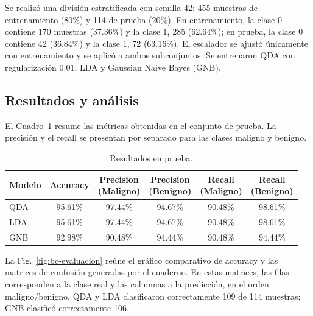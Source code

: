 \documentclass[conference]{IEEEtran}
\begin{document}
Se realizó una división estratificada con semilla 42: 455 muestras de entrenamiento (80\%) y 114 de prueba (20\%). En entrenamiento, la clase 0 contiene 170 muestras (37.36\%) y la clase 1, 285 (62.64\%); en prueba, la clase 0 contiene 42 (36.84\%) y la clase 1, 72 (63.16\%). El escalador se ajustó únicamente con entrenamiento y se aplicó a ambos subconjuntos. Se entrenaron QDA con regularización $0.01$, LDA y Gaussian Naive Bayes (GNB).

\subsection{Resultados y análisis}
El Cuadro~\ref{tab:metricas} resume las métricas obtenidas en el conjunto de prueba. La precisión y el recall se presentan por separado para las clases maligno y benigno.

\begin{table}[!t]
\centering
\caption{Resultados en prueba.}
\label{tab:metricas}
\scriptsize
\setlength{\tabcolsep}{2pt}
\begin{tabular}{l c c c c c}
\toprule
Modelo & Accuracy & \shortstack{Precision\\(Maligno)} & \shortstack{Precision\\(Benigno)} & \shortstack{Recall\\(Maligno)} & \shortstack{Recall\\(Benigno)} \\
\midrule
QDA & 95.61\% & 97.44\% & 94.67\% & 90.48\% & 98.61\% \\
LDA & 95.61\% & 97.44\% & 94.67\% & 90.48\% & 98.61\% \\
GNB & 92.98\% & 90.48\% & 94.44\% & 90.48\% & 94.44\% \\
\bottomrule
\end{tabular}
\end{table}

La Fig.~\ref{fig:bc-evaluacion} reúne el gráfico comparativo de accuracy y las matrices de confusión generadas por el cuaderno. En estas matrices, las filas corresponden a la clase real y las columnas a la predicción, en el orden maligno/benigno. QDA y LDA clasificaron correctamente 109 de 114 muestras; GNB clasificó correctamente 106.
\end{document}
